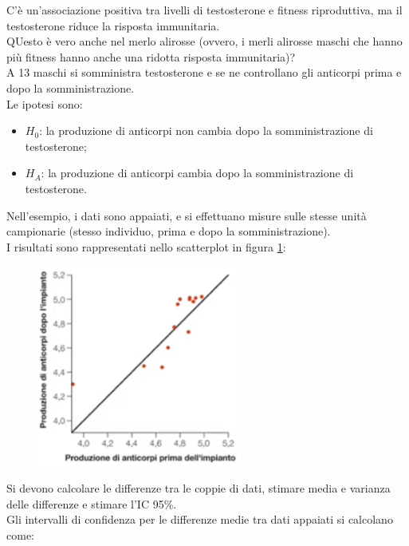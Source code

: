 \documentclass[10pt, draft]{book}
\newcounter{example}[section]
\begin{document}
\begin{example}\label{esmerlo}
    C'è un'associazione positiva tra livelli di testosterone e fitness riproduttiva, ma il testosterone riduce la risposta immunitaria.
    \\
    QUesto è vero anche nel merlo alirosse (ovvero, i merli alirosse maschi che hanno più fitness hanno anche una ridotta risposta immunitaria)?
    \\
    A 13 maschi si somministra testosterone e se ne controllano gli anticorpi prima e dopo la somministrazione.
    \\
    Le ipotesi sono:
    \begin{itemize}
        \item $H_0$: la produzione di anticorpi non cambia dopo la somministrazione di testosterone;
        \item $H_A$: la produzione di anticorpi cambia dopo la somministrazione di testosterone.
    \end{itemize}
    Nell'esempio, i dati sono appaiati, e si effettuano misure sulle stesse unità campionarie (stesso individuo, prima e dopo la somministrazione).
    \\
    I risultati sono rappresentati nello scatterplot in figura \ref{fig12.2-1}:
    \begin{figure}[H]\label{fig12.2-1}
        \centering
        \includegraphics[width=0.6\textwidth]{fig12.2-1}
        \caption{\small{}}
    \end{figure}
    Si devono calcolare le differenze tra le coppie di dati, stimare media e varianza delle differenze e stimare l'IC 95\%.
    \\
    Gli intervalli di confidenza per le differenze medie tra dati appaiati si calcolano come:
    \begin{equation}

\end{equation}
\end{example}
\end{document}

